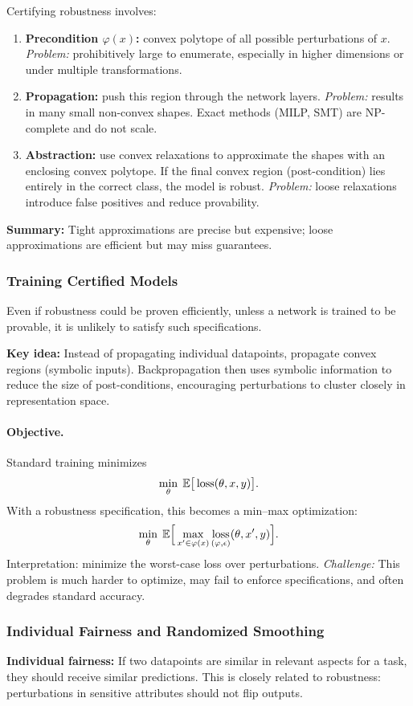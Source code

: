 \documentclass[11pt]{article}
\begin{document}
Certifying robustness involves:
\begin{enumerate}
	\item \textbf{Precondition $\varphi(x)$:} convex polytope of all possible perturbations of $x$.  
	      \emph{Problem:} prohibitively large to enumerate, especially in higher dimensions or under multiple transformations.
	\item \textbf{Propagation:} push this region through the network layers.  
	      \emph{Problem:} results in many small non-convex shapes. Exact methods (MILP, SMT) are NP-complete and do not scale.
	\item \textbf{Abstraction:} use convex relaxations to approximate the shapes with an enclosing convex polytope.  
	      If the final convex region (post-condition) lies entirely in the correct class, the model is robust.  
	      \emph{Problem:} loose relaxations introduce false positives and reduce provability.
\end{enumerate}

\textbf{Summary:} Tight approximations are precise but expensive; loose approximations are efficient but may miss guarantees.

\subsubsection{Training Certified Models}
Even if robustness could be proven efficiently, unless a network is trained to be provable, it is unlikely to satisfy such specifications.

\textbf{Key idea:} Instead of propagating individual datapoints, propagate convex regions (symbolic inputs).  
Backpropagation then uses symbolic information to reduce the size of post-conditions, encouraging perturbations to cluster closely in representation space.

\paragraph{Objective.}  
Standard training minimizes
\[
    \min_\theta \; \mathbb{E} \big[ \operatorname*{loss}(\theta, x, y) \big].
\]
With a robustness specification, this becomes a min–max optimization:
\[
    \min_\theta \; \mathbb{E} \Big[ \max_{x' \in \varphi(x)} \operatorname*{loss}_{(\varphi, \epsilon)}(\theta, x', y) \Big].
\]
Interpretation: minimize the worst-case loss over perturbations.  
\emph{Challenge:} This problem is much harder to optimize, may fail to enforce specifications, and often degrades standard accuracy.

\subsubsection{Individual Fairness and Randomized Smoothing}
\textbf{Individual fairness:} If two datapoints are similar in relevant aspects for a task, they should receive similar predictions.  
This is closely related to robustness: perturbations in sensitive attributes should not flip outputs.
\end{document}
